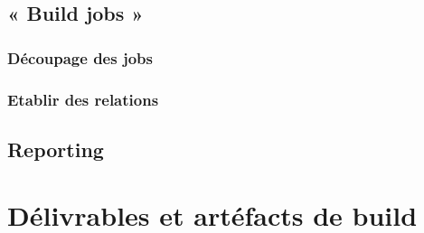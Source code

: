 \documentclass{report}
\begin{document}
        \subsection{« Build jobs »}

          \subsubsection{Découpage des jobs}

          \subsubsection{Etablir des relations}

        \subsection{Reporting}

      \section{Délivrables et artéfacts de build}

  \listoffigures                  %
\end{document}
